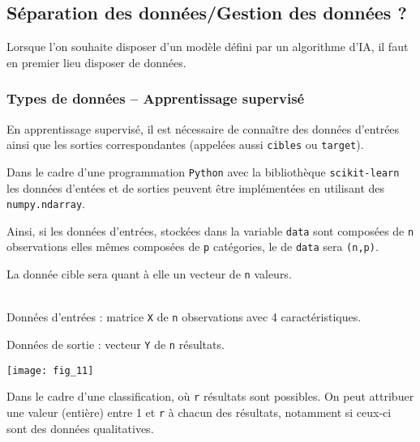 
\subsection{Séparation des données/Gestion des données ?}
Lorsque l'on souhaite disposer d'un modèle défini par un algorithme d'IA, il faut en premier lieu disposer de données. 

\subsubsection{Types de données -- Apprentissage supervisé}

En apprentissage supervisé, il est nécessaire de connaître des données d'entrées ainsi que les sorties correspondantes (appelées aussi \texttt{cibles} ou \texttt{target}).

Dans le cadre d'une programmation \texttt{Python} avec la bibliothèque \texttt{scikit-learn} les données d'entées et de sorties peuvent être implémentées en utilisant des \texttt{numpy.ndarray}.

Ainsi, si les données d'entrées, stockées dans la variable \texttt{data} sont composées de \texttt{n} observations elles mêmes composées de \texttt{p} catégories, le  de \texttt{data} sera \texttt{(n,p)}.

La donnée cible sera quant à elle un vecteur de \texttt{n} valeurs. 

\begin{exemple}~\\

Données d'entrées  : matrice  \texttt{X} de \texttt{n} observations avec 4 caractéristiques. 

Données de sortie : vecteur \texttt{Y} de \texttt{n} résultats. 
\begin{center}
\texttt{[image: fig\_11]}
\end{center}

Dans le cadre d'une classification, où \texttt{r} résultats sont possibles. On peut attribuer une valeur (entière) entre 1 et \texttt{r} à chacun des résultats, notamment si ceux-ci sont des données qualitatives.


\end{exemple}


